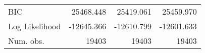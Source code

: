 \begin{center}
\begin{ThreePartTable}
\begin{tabularx}{\textwidth}{X D{.}{.}{6.6} D{.}{.}{6.6} D{.}{.}{6.6}}
BIC                               & 25468.448               & 25419.061               & 25459.970               \\
Log Likelihood                    & -12645.366              & -12610.799              & -12601.633              \\
Num. obs.                         & 19403                   & 19403                   & 19403                   \\
\end{tabularx}
\end{ThreePartTable}
\end{center}

